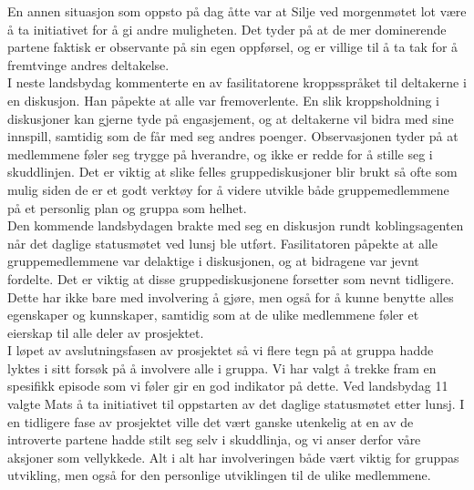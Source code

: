 En annen situasjon som oppsto på dag åtte var at Silje ved morgenmøtet lot være å ta initiativet for å gi andre muligheten. Det tyder på at de mer dominerende partene faktisk er observante på sin egen oppførsel, og er villige til å ta tak for å fremtvinge andres deltakelse.\\

I neste landsbydag kommenterte en av fasilitatorene kroppsspråket til deltakerne i en diskusjon. Han påpekte at alle var fremoverlente. En slik kroppsholdning i diskusjoner kan gjerne tyde på engasjement, og at deltakerne vil bidra med sine innspill, samtidig som de får med seg andres poenger. Observasjonen tyder på at medlemmene føler seg trygge på hverandre, og ikke er redde for å stille seg i skuddlinjen. Det er viktig at slike felles gruppediskusjoner blir brukt så ofte som mulig siden de er et godt verktøy for å videre utvikle både gruppemedlemmene på et personlig plan og gruppa som helhet.\\

Den kommende landsbydagen brakte med seg en diskusjon rundt koblingsagenten når det daglige statusmøtet ved lunsj ble utført. Fasilitatoren påpekte at alle gruppemedlemmene var delaktige i diskusjonen, og at bidragene var jevnt fordelte. Det er viktig at disse gruppediskusjonene forsetter som nevnt tidligere. Dette har ikke bare med involvering å gjøre, men også for å kunne benytte alles egenskaper og kunnskaper, samtidig som at de ulike medlemmene føler et eierskap til alle deler av prosjektet.\\

I løpet av avslutningsfasen av prosjektet så vi flere tegn på at gruppa hadde lyktes i sitt forsøk på å involvere alle i gruppa. Vi har valgt å trekke fram en spesifikk episode som vi føler gir en god indikator på dette. Ved landsbydag 11 valgte Mats å ta initiativet til oppstarten av det daglige statusmøtet etter lunsj. I en tidligere fase av prosjektet ville det vært ganske utenkelig at en av de introverte partene hadde stilt seg selv i skuddlinja, og vi anser derfor våre aksjoner som vellykkede. Alt i alt har involveringen både vært viktig for gruppas utvikling, men også for den personlige utviklingen til de ulike medlemmene.\\


